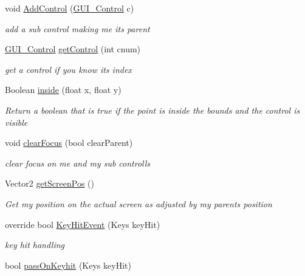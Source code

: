 \begin{DoxyCompactItemize}
void \mbox{\hyperlink{class_r_c___framework_1_1_g_u_i___control_a462903d09f92efd24da0bde3c689b3ef}{Add\+Control}} (\mbox{\hyperlink{class_r_c___framework_1_1_g_u_i___control}{G\+U\+I\+\_\+\+Control}} c)
\begin{DoxyCompactList}\small\item\em add a sub control making me its parent \end{DoxyCompactList}\item 
\mbox{\hyperlink{class_r_c___framework_1_1_g_u_i___control}{G\+U\+I\+\_\+\+Control}} \mbox{\hyperlink{class_r_c___framework_1_1_g_u_i___control_a2808c23510a4448a8928d4393eaa3751}{get\+Control}} (int cnum)
\begin{DoxyCompactList}\small\item\em get a control if you know its index \end{DoxyCompactList}\item 
Boolean \mbox{\hyperlink{class_r_c___framework_1_1_g_u_i___control_a810c7c0dfb643da1861b8e2627642aa1}{inside}} (float x, float y)
\begin{DoxyCompactList}\small\item\em Return a boolean that is true if the point is inside the bounds and the control is visible \end{DoxyCompactList}\item 
void \mbox{\hyperlink{class_r_c___framework_1_1_g_u_i___control_a31b8425ebb4e7f35ddae9736e98e8d5c}{clear\+Focus}} (bool clear\+Parent)
\begin{DoxyCompactList}\small\item\em clear focus on me and my sub controlls \end{DoxyCompactList}\item 
Vector2 \mbox{\hyperlink{class_r_c___framework_1_1_g_u_i___control_aec3a07f10f946dff6dd7563eff7a786d}{get\+Screen\+Pos}} ()
\begin{DoxyCompactList}\small\item\em Get my position on the actual screen as adjusted by my parents position \end{DoxyCompactList}\item 
override bool \mbox{\hyperlink{class_r_c___framework_1_1_g_u_i___control_a458eb00bda180db22ebe22e550a669a4}{Key\+Hit\+Event}} (Keys key\+Hit)
\begin{DoxyCompactList}\small\item\em key hit handling \end{DoxyCompactList}\item 
bool \mbox{\hyperlink{class_r_c___framework_1_1_g_u_i___control_a8e4abd4dc7a2243fc309fb80c984ef9e}{pass\+On\+Keyhit}} (Keys key\+Hit)

\end{DoxyCompactItemize}
